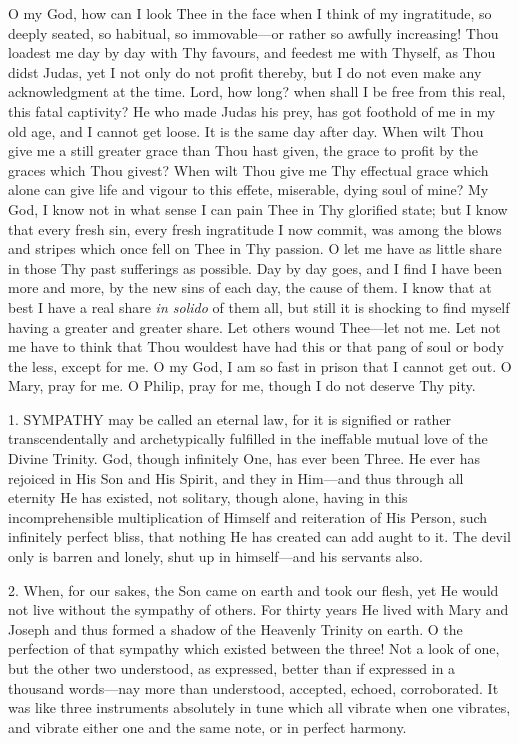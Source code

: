 O my God, how can I look Thee in
the face when I think of my ingratitude, so deeply seated, so habitual,
so immovable—or rather so awfully increasing! Thou loadest me day by
day with Thy favours, and feedest me with Thyself, as Thou didst Judas,
yet I not only do not profit thereby, but I do not even make any
acknowledgment at the time. Lord, how long? when shall I be free from
this real, this fatal captivity? He who made Judas his prey, has got
foothold of me in my old age, and I cannot get loose. It is the same day
after day. When wilt Thou give me a still greater grace than Thou hast
given, the grace to profit by the graces which Thou givest? When wilt
Thou give me Thy effectual grace which alone can give life and vigour to
this effete, miserable, dying soul of mine? My God, I know not in what
sense I can pain Thee in Thy glorified state; but I know that every
fresh sin, every fresh ingratitude I now commit, was among the blows and
stripes which once fell on Thee in Thy passion. O let me have as little
share in those Thy past sufferings as possible. Day by day goes, and I
find I have been more and more, by the new sins of each day, the cause
of them. I know that at best I have a real share \emph{in solido}
of them all, but still it is shocking to find myself having a greater
and greater share. Let others wound Thee—let not me. Let not me have
to think that Thou wouldest have had this or that pang of soul or body
the less, except for me. O my God, I am so fast in prison that I cannot
get out. O Mary, pray for me. O Philip, pray for me, though I do not
deserve Thy pity.


1. SYMPATHY
may be called an eternal law, for it is signified or rather
transcendentally and archetypically fulfilled in the ineffable mutual
love of the Divine Trinity. God, though infinitely One, has ever been
Three. He ever has rejoiced in His Son and His Spirit, and they in
Him—and thus through all eternity He has existed, not solitary, though
alone, having in this incomprehensible multiplication of Himself and
reiteration of His Person, such infinitely perfect bliss, that nothing
He has created can add aught to it. The devil only is barren and lonely,
shut up in himself—and his servants also.

2. When, for our sakes, the Son
came on earth and took our flesh, yet He would not live without the
sympathy of others. For thirty years He lived with Mary and Joseph and
thus formed a shadow of the Heavenly Trinity on earth. O the perfection
of that sympathy which existed between the three! Not a look of
one, but the other two understood, as expressed, better than if
expressed in a thousand words—nay more than understood, accepted,
echoed, corroborated. It was like three instruments absolutely in tune
which all vibrate when one vibrates, and vibrate either one and the same
note, or in perfect harmony.


